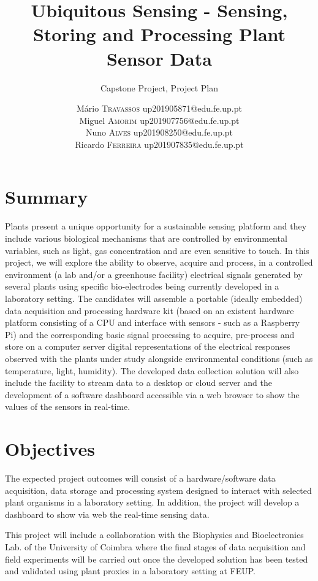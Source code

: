 \documentclass[a4paper, 11pt]{report}
\institute{Faculdade de Engenharia}
\title{Ubiquitous Sensing - Sensing, Storing and Processing Plant Sensor Data}
\subtitle{Capstone Project, Project Plan}
\author{Mário \textsc{Travassos} up201905871@edu.fe.up.pt \\ Miguel \textsc{Amorim} up201907756@edu.fe.up.pt \\ Nuno \textsc{Alves} up201908250@edu.fe.up.pt \\ Ricardo \textsc{Ferreira} up201907835@edu.fe.up.pt}
\date{\formatdate{27}{03}{2022}}
\begin{document}
    \maketitle
    \romantableofcontents
    
\chapter{Summary}

Plants present a unique opportunity for a sustainable sensing platform and they include various biological mechanisms that are controlled by environmental variables, such as light, gas concentration and are even sensitive to touch. 
In this project, we will explore the ability to observe, acquire and process, in a controlled environment (a lab and/or a greenhouse facility) electrical signals generated by several plants using specific bio-electrodes being currently developed in a laboratory setting. The candidates will assemble a portable (ideally embedded) data acquisition and processing hardware kit (based on an existent hardware platform consisting of a CPU and interface with sensors - such as a Raspberry Pi) and the corresponding basic signal processing to acquire, pre-process and store on a computer server digital representations of the electrical responses observed with the plants under study alongside environmental conditions (such as temperature, light, humidity). The developed data collection solution will also include the facility to stream data to a desktop or cloud server and the development of a software dashboard accessible via a web browser to show the values of the sensors in real-time.


\break

\chapter{Objectives}

The expected project outcomes will consist of a hardware/software data acquisition, data storage and processing system designed to interact with selected plant organisms in a laboratory setting. In addition, the project will develop a dashboard to show via web the real-time sensing data.

This project will include a collaboration with the Biophysics and Bioelectronics Lab. of the University of Coimbra where the final stages of data acquisition and field experiments will be carried out once the developed solution has been tested and validated using plant proxies in a laboratory setting at FEUP.
\end{document}
